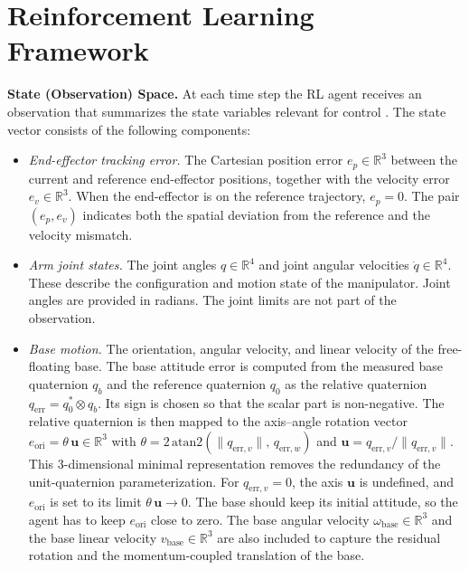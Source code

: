 \documentclass{ieeeaccess}
\begin{document}
\section{Reinforcement Learning Framework}\label{RL}
\textbf{State (Observation) Space.} At each time step the RL agent receives an observation that
summarizes the state variables relevant for control \cite{b7}. The state vector consists of the
following components:
\begin{itemize}
  \item \textit{End-effector tracking error.} The Cartesian position error $e_p \in \mathbb{R}^3$ between the current
  and reference end-effector positions, together with the velocity error $e_v \in \mathbb{R}^3$. When the
end-effector is on the reference trajectory, $e_p = 0$. The pair $(e_p, e_v)$
indicates both the spatial deviation from the reference and the velocity mismatch.
  \item \textit{Arm joint states.} The joint angles $q \in \mathbb{R}^4$ and joint angular velocities
  $\dot{q} \in \mathbb{R}^4$. These describe the configuration and motion state of the manipulator. Joint
  angles are provided in radians. The joint limits are not part of the observation.
  \item \textit{Base motion.} The orientation, angular velocity, and linear velocity of the free-floating
  base. The base attitude error is computed from the measured base quaternion $q_b$ and the reference
  quaternion $q_0$ as the relative quaternion $q_{\mathrm{err}} = q_0^{*} \otimes q_b$. Its sign is
  chosen so that the scalar part is non-negative. The relative quaternion is then mapped to the
  axis--angle rotation vector $e_{\mathrm{ori}} = \theta\,\mathbf{u} \in \mathbb{R}^3$ with
  $\theta = 2\,\mathrm{atan2}(\|q_{\mathrm{err},v}\|,\,q_{\mathrm{err},w})$ and
  $\mathbf{u} = q_{\mathrm{err},v}/\|q_{\mathrm{err},v}\|$. This 3-dimensional minimal representation
  removes the redundancy of the unit-quaternion parameterization. For $q_{\mathrm{err},v} = 0$,
  the axis $\mathbf{u}$ is undefined, and $e_{\mathrm{ori}}$ is set to its limit
  $\theta\,\mathbf{u} \to 0$. The base should keep its initial attitude, so the agent has to keep
  $e_{\mathrm{ori}}$ close to zero. The base angular velocity
  $\omega_{\mathrm{base}} \in \mathbb{R}^3$ and the base linear velocity
  $v_{\mathrm{base}} \in \mathbb{R}^3$ are also included to capture the residual rotation and the
  momentum-coupled translation of the base.
\end{itemize}
\end{document}
